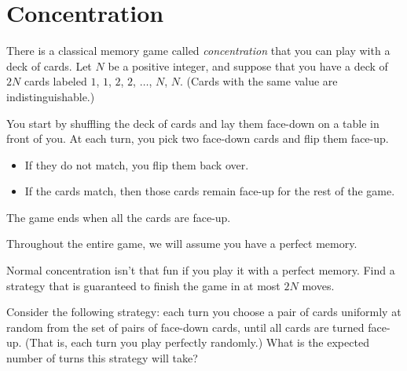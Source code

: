 \documentclass[10pt]{article}
\newif\ifpaper
\begin{document}
\section{Concentration}
There is a classical memory game called \emph{concentration}
that you can play with a deck of cards.
Let $N$ be a positive integer, and suppose that
you have a deck of $2N$ cards labeled $1$, $1$, $2$, $2$, $\dots$, $N$, $N$.
(Cards with the same value are indistinguishable.)

You start by shuffling the deck of cards and lay them face-down on a table in front of you.
At each turn, you pick two face-down cards and flip them face-up.
\begin{itemize}
    \item If they do not match, you flip them back over. 
    \item If the cards match, then those cards remain face-up for the rest of the game.
\end{itemize}
The game ends when all the cards are face-up.

Throughout the entire game, we will assume you have a perfect memory.

\begin{problem}[4 points]
    Normal concentration isn't that fun if you play it with a perfect memory.
    Find a strategy that is guaranteed to finish the game in at most $2N$ moves.
\end{problem}

\ifpaper
\begin{tcolorbox}
On turn $t$ for $1\le t\le N$, flip over cards $\{2t-1,2t\}$. After this, we know exactly where every card is. Therefore, in the next $N$ turns, we can simply flip over pairs of matching cards because we know where they are.
\end{tcolorbox}
\fi

\begin{problem}
    [6 points]
    Consider the following strategy:
    each turn you choose a pair of cards uniformly at random
    from the set of pairs of face-down cards,
    until all cards are turned face-up.
    (That is, each turn you play perfectly randomly.)
    What is the expected number of turns this strategy will take?
\end{problem}

\ifpaper
\begin{tcolorbox}
This strategy takes an expected $N^2$ steps. When $N=1$, it obviously takes $1$ step. When $N>1$, the waiting time until we see a matching pair has a geometric distribution with parameter $\frac{N}{\binom{2N}2}=\frac1{2N-1}$. Therefore, in expectation, we take $\left(\frac1{2N-1}\right)^{-1}=2N-1$ steps and commence the exact same strategy for $N-1$. By linearity of expectation, the answer is just \[1+\sum_{k=2}^N\left(2k-1\right)=N^2\]
\end{tcolorbox}
\fi
\end{document}
